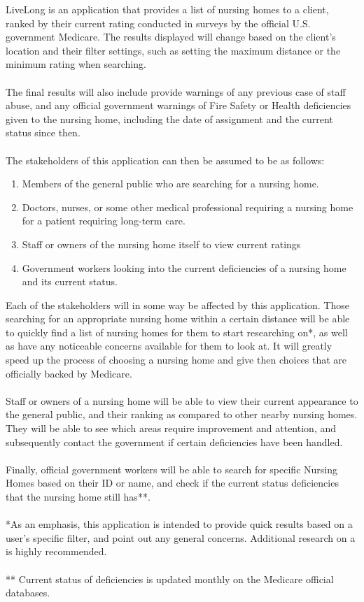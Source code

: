 \documentclass[12pt]{article}
\begin{document}
LiveLong is an application that provides a list of nursing homes to a client, ranked by their current rating conducted in surveys by the official U.S. government Medicare. The results displayed will change based on the client's location and their filter settings, such as setting the maximum distance or the minimum rating when searching. 
\\ \\
The final results will also include provide warnings of any previous case of staff abuse, and any official government warnings of Fire Safety or Health deficiencies given to the nursing home, including the date of assignment and the current status since then. 
\\ \\
The stakeholders of this application can then be assumed to be as follows:
\begin{enumerate}
\item Members of the general public who are searching for a nursing home.
\item Doctors, nurses, or some other medical professional requiring a nursing home for a patient requiring long-term care.
\item Staff or owners of the nursing home itself to view current ratings
\item Government workers looking into the current deficiencies of a nursing home and its current status.
\end{enumerate}
Each of the stakeholders will in some way be affected by this application. Those searching for an appropriate nursing home within a certain distance will be able to quickly find a list of nursing homes for them to start researching on*, as well as have any noticeable concerns available for them to look at. It will greatly speed up the process of choosing a nursing home and give then choices that are officially backed by Medicare.
\\ \\ 
Staff or owners of a nursing home will be able to view their current appearance to the general public, and their ranking as compared to other nearby nursing homes. They will be able to see which areas require improvement and attention, and subsequently contact the government if certain deficiencies have been handled. 
\\ \\
Finally, official government workers will be able to search for specific Nursing Homes based on their ID or name, and check if the current status deficiencies that the nursing home still has**.
\\ \\
*As an emphasis, this application is intended to provide quick results based on a user's specific filter, and point out any general concerns. Additional research on a is highly recommended.
\\ \\
** Current status of deficiencies is updated monthly on the Medicare official databases.
\newpage
\end{document}
